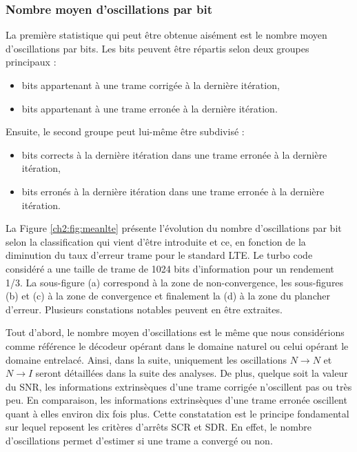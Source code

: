 \subsubsection{Nombre moyen d'oscillations par bit}
La première statistique qui peut être obtenue aisément est le nombre moyen d'oscillations par bits. Les bits peuvent être 
répartis selon deux groupes principaux :
\begin{itemize}
	\item bits appartenant à une trame corrigée à la dernière itération,
	\item bits appartenant à une trame erronée à la dernière itération.\newline
\end{itemize}
Ensuite, le second groupe peut lui-même être subdivisé :
\begin{itemize}
	\item bits corrects à la dernière itération dans une trame erronée à la dernière itération,
	\item bits erronés à la dernière itération dans une trame erronée à la dernière itération. \newline
\end{itemize}
La Figure \ref{ch2:fig:meanlte} présente l'évolution du nombre d'oscillations par bit selon la classification qui 
vient d'être introduite et ce, en fonction de la diminution du taux d'erreur trame pour le standard LTE. Le turbo code 
considéré a une taille de trame de 1024 bits d'information pour un rendement 1/3. La sous-figure 
(a) correspond à la zone de non-convergence, les sous-figures (b) et (c) à la zone de convergence et finalement la (d) à 
la zone du plancher d'erreur. Plusieurs constations notables peuvent en être extraites. 

Tout d'abord, le nombre moyen d'oscillations est le même que nous considérions comme référence le décodeur opérant dans le 
domaine naturel ou celui opérant le domaine entrelacé. Ainsi, dans la suite, uniquement les oscillations $N\rightarrow N$ 
et $N\rightarrow I$ seront détaillées dans la suite des analyses.
De plus, quelque soit la valeur du SNR, les informations extrinsèques d'une trame corrigée n'oscillent pas ou très 
peu. En comparaison, les informations extrinsèques d'une trame erronée oscillent quant à elles environ dix fois plus.
Cette constatation est le principe fondamental sur lequel reposent les critères d'arrêts SCR et SDR. En effet, le nombre 
d'oscillations permet d'estimer si une trame a convergé ou non.

